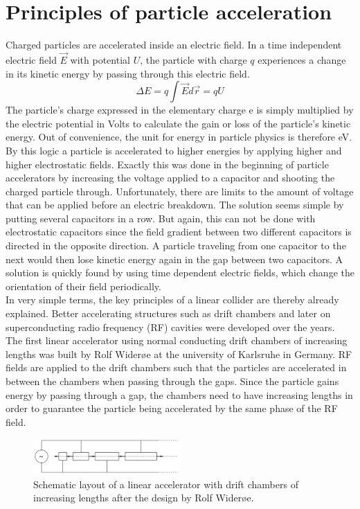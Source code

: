 \section{Principles of particle acceleration}
\label{AcceleratorPhysics}
Charged particles are accelerated inside an electric field. 
In a time independent electric field $\vec{E}$ with potential $U$, the particle with charge $q$ experiences a change in its kinetic energy by passing through this electric field.
\begin{equation}
 \Delta E = q \int \vec{E}d\vec{r} = qU
\end{equation}
The particle's charge expressed in the elementary charge e is simply multiplied by the electric potential in Volts to calculate the gain or loss of the particle's kinetic energy. 
Out of convenience, the unit for energy in particle physics is therefore eV.\\
By this logic a particle is accelerated to higher energies by applying higher and higher electrostatic fields. 
Exactly this was done in the beginning of particle accelerators by increasing the voltage applied to a capacitor and shooting the charged particle through. 
Unfortunately, there are limits to the amount of voltage that can be applied before an electric breakdown.
The solution seems simple by putting several capacitors in a row.
But again, this can not be done with electrostatic capacitors since the field gradient between two different capacitors is directed in the opposite direction.
A particle traveling from one capacitor to the next would then lose kinetic energy again in the gap between two capacitors.
A solution is quickly found by using time dependent electric fields, which change the orientation of their field periodically.\\
In very simple terms, the key principles of a linear collider are thereby already explained.
Better accelerating structures such as drift chambers and later on superconducting radio frequency (RF) cavities were developed over the years.
The first linear accelerator using normal conducting drift chambers of increasing lengths was built by Rolf Wider\o e at the university of Karlsruhe in Germany.
RF fields are applied to the drift chambers such that the particles are accelerated in between the chambers when passing through the gaps.
Since the particle gains energy by passing through a gap, the chambers need to have increasing lengths in order to guarantee the particle being accelerated by the same phase of the RF field.
\begin{figure}
\centering
\includegraphics[width=0.5\textwidth]{Figures/Wideroe_Linac.png}
\caption[Schematic layout of a Wider\o e linac]{Schematic layout of a linear accelerator with drift chambers of increasing lengths after the design by Rolf Wider\o e.~\cite[p. 40]{Hinterberger}}
\label{fig:Wideroe_Linac}
\end{figure}
